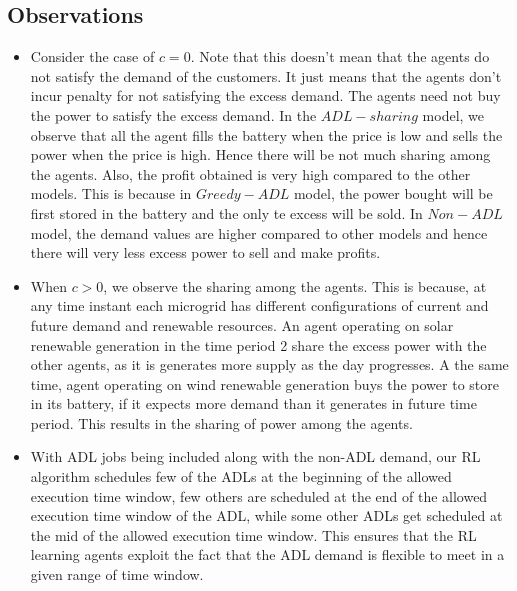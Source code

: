 \subsection{Observations}
\begin{itemize}

\item Consider the case of $c = 0$. Note that this doesn't mean that the agents do not satisfy the demand of the customers. It just means that the agents don't incur penalty for not satisfying the excess demand. The agents need not buy the power to satisfy the excess demand. In the $ADL-sharing$ model, we observe that all the agent fills the battery when the price is low and sells the power when the price is high. Hence there will be not much sharing among the agents. Also, the profit obtained is very high compared to the other models. This is because in $Greedy-ADL$ model, the power bought will be first stored in the battery and the only te excess will be sold. In $Non-ADL$ model, the demand values are higher compared to other models and hence there will very less excess power to sell and make profits.

\item When $c >0$, we observe the sharing among the agents. This is because, at any time instant each microgrid has different configurations of current and future demand and renewable resources. An agent operating on solar renewable generation in the time period 2 share the excess power with the other agents, as it is generates more supply as the day progresses. A the same time, agent operating on wind renewable generation buys the power to store in its battery, if it expects more demand than it generates in future time period. This results in the sharing of power among the agents.   
	
\item With ADL jobs being included along with the non-ADL demand, our RL algorithm schedules few of the ADLs at the beginning of the allowed execution time window, few others are scheduled at the end of the allowed execution time window of the ADL, while some other ADLs get scheduled at the mid of the allowed execution time window. This ensures that the RL learning agents exploit the fact that the ADL demand is flexible to meet in a given range of time window. %


\end{itemize}
